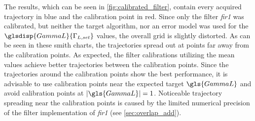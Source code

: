 \documentclass[12pt,a4paper,parskip=full,abstract=true,BCOR=12mm,twoside,open=right]{scrreprt}
\providecommand{\abs}[1]{\lvert#1\rvert}
\def\device#1{\textit{#1}}
\begin{document}
The results, which can be seen in \cref{fig:calibrated_filter}, contain every acquired
trajectory in blue and the calibration point in red. Since only the filter \device{fir1}
was calibrated, but neither the target algorithm, nor an error model was used for the
$\glsdisp{GammaL}{\Gamma_{L,set}}$ values, the overall grid is slightly distorted. As can be seen in these
smith charts, the trajectories spread out at points far away from the calibration points.
As expected, the filter calibrations utilizing the mean values achieve better trajectories
between the calibration points. Since the trajectories around the calibration points
show the best performance, it is advisable to use calibration points near the expected
target $\gls{GammaL}$ and avoid calibration points at $\abs{\gls{GammaL}} = 1$. Noticeable
trajectory spreading near the calibration points is caused by the limited numerical
precision of the filter implementation of \device{fir1} (see \cref{sec:overlap_add}).
\end{document}
